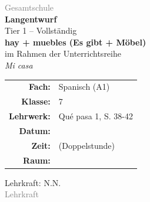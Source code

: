 \documentclass[11pt,a4paper]{article}
\newcommand{\fach}{Spanisch}
\newcommand{\jahrgangsstufe}{7}
\newcommand{\schulart}{Gesamtschule}
\newcommand{\stundenthema}{hay + muebles (Es gibt + Möbel)}
\newcommand{\reihenthema}{Mi casa}
\newcommand{\lehrkraft}{N.N.}
\newcommand{\ausbildungsstand}{Lehrkraft}
\newcommand{\gerniveau}{A1}
\newcommand{\lehrwerk}{Qué pasa 1}
\newcommand{\lehrwerkseite}{S. 38-42}
\begin{document}
\begin{titlepage}
    \centering
    \vspace*{2cm}

    {\large\textcolor{gray}{\schulart}}\\[2cm]

    {\Huge\textcolor{fach}{\textbf{Langentwurf}}}\\[0.5cm]
    {\large Tier 1 -- Vollständig}\\[2cm]

    {\LARGE\textbf{\stundenthema}}\\[0.5cm]
    {\large im Rahmen der Unterrichtsreihe}\\[0.3cm]
    {\Large\textit{\reihenthema}}\\[2cm]

    \begin{tabular}{rl}
        \textbf{Fach:} & \fach{} (\gerniveau) \\[0.3cm]
        \textbf{Klasse:} & \jahrgangsstufe \\[0.3cm]
        \textbf{Lehrwerk:} & \lehrwerk, \lehrwerkseite \\[0.3cm]
        \textbf{Datum:} & \underline{\hspace{3cm}} \\[0.3cm]
        \textbf{Zeit:} & \underline{\hspace{3cm}} (Doppelstunde) \\[0.3cm]
        \textbf{Raum:} & \underline{\hspace{3cm}} \\[0.3cm]
    \end{tabular}

    \vfill

    {\large Lehrkraft: \lehrkraft}\\[0.3cm]
    {\normalsize\textcolor{gray}{\ausbildungsstand}}\\[1cm]

\end{titlepage}

\tableofcontents
\newpage

\end{document}
